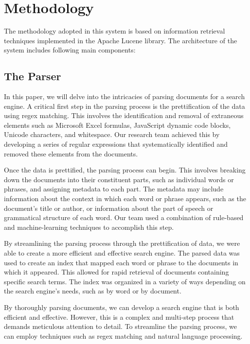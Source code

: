 \section{Methodology}
\label{sec:methodology}

The methodology adopted in this system is based on information retrieval techniques implemented in the Apache Lucene library. The architecture of the system includes following main components:

\subsection{The Parser}
In this paper, we will delve into the intricacies of parsing documents for a search engine. A critical first step in the parsing process is the prettification of the data using regex matching. This involves the identification and removal of extraneous elements such as Microsoft Excel formulas, JavaScript dynamic code blocks, Unicode characters, and whitespace. Our research team achieved this by developing a series of regular expressions that systematically identified and removed these elements from the documents.

Once the data is prettified, the parsing process can begin. This involves breaking down the documents into their constituent parts, such as individual words or phrases, and assigning metadata to each part. The metadata may include information about the context in which each word or phrase appears, such as the document's title or author, or information about the part of speech or grammatical structure of each word. Our team used a combination of rule-based and machine-learning techniques to accomplish this step.

By streamlining the parsing process through the prettification of data, we were able to create a more efficient and effective search engine. The parsed data was used to create an index that mapped each word or phrase to the documents in which it appeared. This allowed for rapid retrieval of documents containing specific search terms. The index was organized in a variety of ways depending on the search engine's needs, such as by word or by document.

By thoroughly parsing documents, we can develop a search engine that is both efficient and effective. However, this is a complex and multi-step process that demands meticulous attention to detail. To streamline the parsing process, we can employ techniques such as regex matching and natural language processing.

